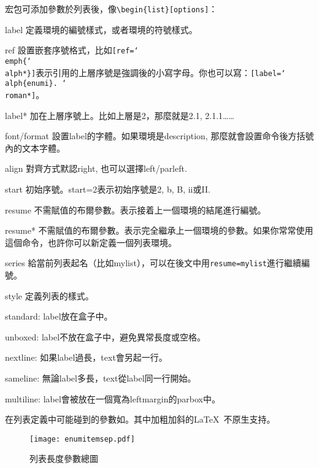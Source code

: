 宏包可添加參數於列表後，像\verb|\begin{list}[options]|：
\begin{para}
\item[label] 定義環境的編號樣式，或者環境的符號樣式。
\item[ref] 設置嵌套序號格式，比如\texttt{[ref=\char`\\emph\{\char`\\alph*\}]}表示引用的上層序號是強調後的小寫字母。你也可以寫：\texttt{[label=\char`\\alph\{enumi\}.\ \char`\\roman*]}。
\item[label*] 加在上層序號上。比如上層是2，那麼就是2.1, 2.1.1……
\item[font/format] 設置label的字體。如果環境是description, 那麼就會設置命令後方括號內的文本字體。
\item[align] 對齊方式默認right, 也可以選擇left/parleft.
\item[start] 初始序號。start=2表示初始序號是2, b, B, ii或II.
\item[resume] 不需賦值的布爾參數。表示接着上一個環境的結尾進行編號。
\item[resume*] 不需賦值的布爾參數。表示完全繼承上一個環境的參數。如果你常常使用這個命令，也許你可以新定義一個列表環境。
\item[series] 給當前列表起名（比如mylist），可以在後文中用\texttt{resume=mylist}進行繼續編號。
\item[style] 定義列表的樣式。
\begin{para}
\item[standard:] label放在盒子中。
\item[unboxed:] label不放在盒子中，避免異常長度或空格。
\item[nextline:] 如果label過長，text會另起一行。
\item[sameline:] 無論label多長，text從label同一行開始。
\item[multiline:] label會被放在一個寬為leftmargin的parbox中。
\end{para}
\end{para}

在列表定義中可能碰到的參數如。其中加粗加斜的\LaTeX\ 不原生支持。
\begin{figure}[!hbt]
\texttt{[image: enumitemsep.pdf]}
\caption{列表長度參數總圖}
\label{fig:enumitemsep}
\end{figure}

